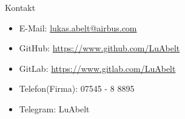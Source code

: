 \begin{frame}{Kontakt}{}
	\begin{itemize}
		\item E-Mail: \href{mailto:lukas.abelt@airbus.com}{lukas.abelt@airbus.com}
		\item GitHub: \url{https://www.github.com/LuAbelt}
		\item GitLab: \url{https://www.gitlab.com/LuAbelt}
		\item Telefon(Firma): 07545 - 8 8895
		\item Telegram: LuAbelt
	\end{itemize}
\end{frame}